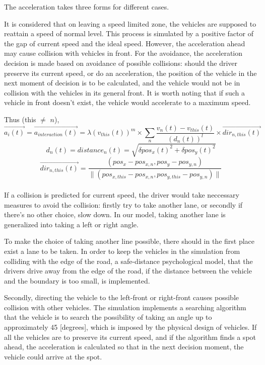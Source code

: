 \documentclass{mcmthesis}
\begin{document}
The acceleration takes three forms for different cases.

It is considered that on leaving a speed limited zone, the vehicles are supposed to reattain a speed of normal level. This process is simulated by a positive factor of the gap of current speed and the ideal speed. However, the acceleration ahead may cause collision with vehicles in front. For the avoidance, the acceleration decision is made based on avoidance of possible collisions: should the driver preserve its current speed, or do an acceleration, the position of the vehicle in the next moment of decision is to be calculated, and the vehicle would not be in collision with the vehicles in its general front. It is worth noting that if such a vehicle in front doesn't exist, the vehicle would accelerate to a maximum speed.

Thus (this $\ne$ $n$),
$$\overrightarrow{a_i(t)}=\overrightarrow{a_{interaction}(t)}=\lambda (v_{this}(t))^m \times \sum_n\frac{v_n(t)-v_{this}(t)}{(d_n(t))^l}\times \overrightarrow{dir_{n,this}(t)}$$
$$d_{n}(t)=distance_n(t)=\sqrt{\delta pos_x(t)^2+\delta pos_y(t)^2}$$
$$\overrightarrow{dir_{n,this}(t)}=\frac{(pos_x-pos_{x,n},pos_y-pos_{y,n})}{\parallel (pos_{x,this}-pos_{x,n},pos_{y,this}-pos_{y,n}) \parallel} $$\\ [加速度第一部分公式]

If a collision is predicted for current speed, the driver would take neccessary measures to avoid the collision: firstly try to take another lane, or secondly if there's no other choice, slow down. In our model, taking another lane is generalized into taking a left or right angle.

To make the choice of taking another line possible, there should in the first place exist a lane to be taken. In order to keep the vehicles in the simulation from colliding with the edge of the road, a safe-distance psychological model, that the drivers drive away from the edge of the road, if the distance between the vehicle and the boundary is too small, is implemented. 

Secondly, directing the vehicle to the left-front or right-front causes possible collision with other vehicles. The simulation implements a searching algorithm that the vehicle is to search the possibility of taking an angle up to approximately 45 [degrees], which is imposed by the physical design of vehicles. If all the vehicles are to preserve its current speed, and if the algorithm finds a spot ahead, the acceleration is calculated so that in the next decision moment, the vehicle could arrive at the spot.
\end{document}
